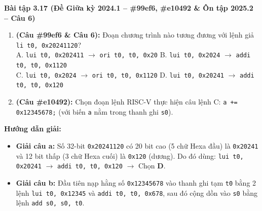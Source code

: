 \textbf{Bài tập 3.17 (Đề Giữa kỳ 2024.1 -- \#99ef6, \#e10492 \& Ôn tập 2025.2 -- Câu 6)}
\begin{enumerate}[label=\alph*)]
    \item \textbf{(Câu \#99ef6 \& Câu 6):} Đoạn chương trình nào tương đương với lệnh giả \texttt{li t0, 0x20241120}?\\
    A. \texttt{lui t0, 0x202411} $\rightarrow$ \texttt{ori t0, t0, 0x20} \quad B. \texttt{lui t0, 0x2024} $\rightarrow$ \texttt{addi t0, t0, 0x1120}\\
    C. \texttt{lui t0, 0x2024} $\rightarrow$ \texttt{ori t0, t0, 0x1120} \quad D. \texttt{lui t0, 0x20241} $\rightarrow$ \texttt{addi t0, t0, 0x120}
    \item \textbf{(Câu \#e10492):} Chọn đoạn lệnh RISC-V thực hiện câu lệnh C: \texttt{a += 0x12345678;} (với biến \texttt{a} nằm trong thanh ghi \texttt{s0}).
\end{enumerate}
\textbf{Hướng dẫn giải:}
\begin{itemize}
    \item \textbf{Giải câu a:} Số 32-bit \texttt{0x20241120} có 20 bit cao (5 chữ Hexa đầu) là \texttt{0x20241} và 12 bit thấp (3 chữ Hexa cuối) là \texttt{0x120} (dương). Do đó dùng: \texttt{lui t0, 0x20241} $\rightarrow$ \texttt{addi t0, t0, 0x120} $\rightarrow$ Chọn \textbf{D}.
    \item \textbf{Giải câu b:} Đầu tiên nạp hằng số \texttt{0x12345678} vào thanh ghi tạm \texttt{t0} bằng 2 lệnh \texttt{lui t0, 0x12345} và \texttt{addi t0, t0, 0x678}, sau đó cộng dồn vào \texttt{s0} bằng lệnh \texttt{add s0, s0, t0}.
\end{itemize}

